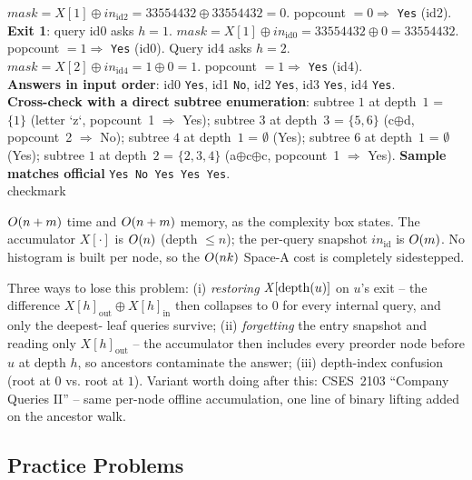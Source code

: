 \begin{tracebox}[CF 570D sample: $n{=}6$, parents $1,1,1,3,3$, string \texttt{zacccd}, $m{=}5$ queries]
$\mathit{mask}=\mathit{X}[1]\oplus\mathit{in}_{\text{id}2}=33554432\oplus 33554432=0$.
popcount $=0 \Rightarrow$ \texttt{Yes} (id2).\\
\textbf{Exit 1}: query id0 asks $h{=}1$.
$\mathit{mask}=\mathit{X}[1]\oplus\mathit{in}_{\text{id}0}=33554432\oplus 0=33554432$.
popcount $=1 \Rightarrow$ \texttt{Yes} (id0). Query id4 asks $h{=}2$.
$\mathit{mask}=\mathit{X}[2]\oplus\mathit{in}_{\text{id}4}=1\oplus 0=1$.
popcount $=1 \Rightarrow$ \texttt{Yes} (id4).
\\[3pt]
\textbf{Answers in input order}: id0 \texttt{Yes}, id1 \texttt{No},
id2 \texttt{Yes}, id3 \texttt{Yes}, id4 \texttt{Yes}. \\
\textbf{Cross-check with a direct subtree enumeration}: subtree $1$ at
depth~$1$ = $\{1\}$ (letter `z`, popcount~1 $\Rightarrow$ Yes);
subtree $3$ at depth~$3$ = $\{5,6\}$ (c$\oplus$d, popcount~2 $\Rightarrow$ No);
subtree $4$ at depth~$1$ = $\emptyset$ (Yes); subtree $6$ at depth~$1$
= $\emptyset$ (Yes); subtree $1$ at depth~$2$ = $\{2,3,4\}$
(a$\oplus$c$\oplus$c, popcount~1 $\Rightarrow$ Yes).
\textbf{Sample matches official} \texttt{Yes No Yes Yes Yes}. \\checkmark
\end{tracebox}

$O(n+m)$ time and $O(n+m)$ memory, as the
 complexity box states. The accumulator
$\mathit{X}[\cdot]$ is $O(n)$ (depth $\le n$); the per-query
snapshot $\mathit{in}_{\text{id}}$ is $O(m)$. No histogram is built
per node, so the $O(nk)$ Space-A cost is completely sidestepped.

\begin{warningbox}
Three ways to lose this problem: (i) \emph{restoring} $\mathit{X}[\operatorname{depth}(u)]$
on $u$'s exit -- the difference $\mathit{X}[h]_{\mathrm{out}}\oplus\mathit{X}[h]_{\mathrm{in}}$
then collapses to $0$ for every internal query, and only the deepest-
leaf queries survive; (ii) \emph{forgetting} the entry snapshot and
reading only $\mathit{X}[h]_{\mathrm{out}}$ -- the accumulator then
includes every preorder node before $u$ at depth $h$, so ancestors
contaminate the answer; (iii) depth-index confusion (root at $0$ vs.
root at $1$). Variant worth doing after this: CSES~2103 ``Company
Queries II'' -- same per-node offline accumulation, one line of binary
lifting added on the ancestor walk.
\end{warningbox}

\subsection{Practice Problems}

